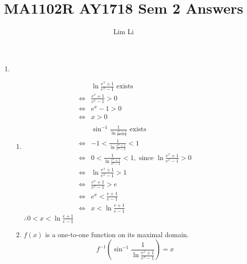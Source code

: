 \documentclass[12pt]{article}
\theoremstyle{definition}
\begin{document}
\title{MA1102R AY1718 Sem 2 Answers}
\author{Lim Li}
\maketitle
\begin{enumerate}
  \item\begin{enumerate}
          \item
                \begin{align*}
                       & \ln{\frac{e^x+1}{e^x-1}} \text{ exists}                                                     \\
                  \iff & \frac{e^x+1}{e^x-1}>0                                                                       \\
                  \iff & e^x-1>0                                                                                     \\
                  \iff & x>0                                                                                         \\\\
                       & \sin^{-1}\frac{1}{\ln{\frac{e^x+1}{e^x-1}}} \text{ exists}                                  \\
                  \iff & -1<\frac{1}{\ln{\frac{e^x+1}{e^x-1}}}<1 \\
                  \iff & 0<\frac{1}{\ln{\frac{e^x+1}{e^x-1}}}<1,\text{ since }\ln{\frac{e^x+1}{e^x-1}}>0 \\
                  \iff & \ln{\frac{e^x+1}{e^x-1}} > 1                                                    \\
                  \iff & \frac{e^x+1}{e^x-1} > e                                                             \\
                  \iff & e^{x}<\frac{e+1}{e-1}                                                       \\
                  \iff & x < \ln{\frac{e+1}{e-1}}
                \end{align*}
                $\therefore 0 < x < \ln{\frac{e+1}{e-1}}$
          \item $f(x)$ is a one-to-one function on its maximal domain.\\
                \begin{equation*}
                  f^{-1}(\sin^{-1}\frac{1}{\ln{\frac{e^x+1}{e^x-1}}})=x
                \end{equation*}

\end{enumerate}
\end{enumerate}
\end{document}
